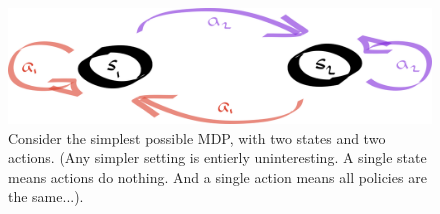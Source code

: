 \begin{figure}
\centering
\includegraphics[width=1\textwidth,height=0.25\textheight]{../../pictures/drawings/2-state-automata.png}
\caption{Consider the simplest possible MDP, with two states and two actions. (Any simpler setting is entierly uninteresting. A single state means actions do nothing.
And a single action means all policies are the same...).}
\end{figure}


